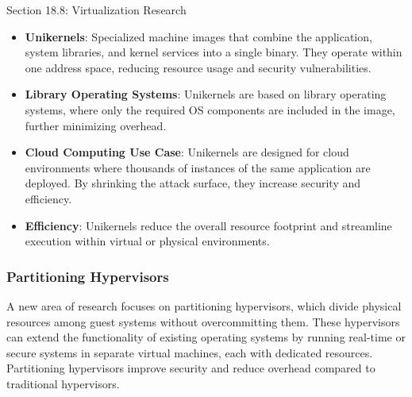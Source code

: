 \begin{notes}{Section 18.8: Virtualization Research}
\begin{highlight}
        \begin{itemize}
            \item \textbf{Unikernels}: Specialized machine images that combine the application, system libraries, and kernel services into a single binary. They operate within one address space, reducing 
            resource usage and security vulnerabilities.
            \item \textbf{Library Operating Systems}: Unikernels are based on library operating systems, where only the required OS components are included in the image, further minimizing overhead.
            \item \textbf{Cloud Computing Use Case}: Unikernels are designed for cloud environments where thousands of instances of the same application are deployed. By shrinking the attack surface, they 
            increase security and efficiency.
            \item \textbf{Efficiency}: Unikernels reduce the overall resource footprint and streamline execution within virtual or physical environments.
        \end{itemize}
    
    \end{highlight}
    
    \subsubsection*{Partitioning Hypervisors}
    
    A new area of research focuses on partitioning hypervisors, which divide physical resources among guest systems without overcommitting them. These hypervisors can extend the functionality of existing 
    operating systems by running real-time or secure systems in separate virtual machines, each with dedicated resources. Partitioning hypervisors improve security and reduce overhead compared to traditional hypervisors.
    
    \begin{highlight}
    

\end{highlight}
\end{notes}
